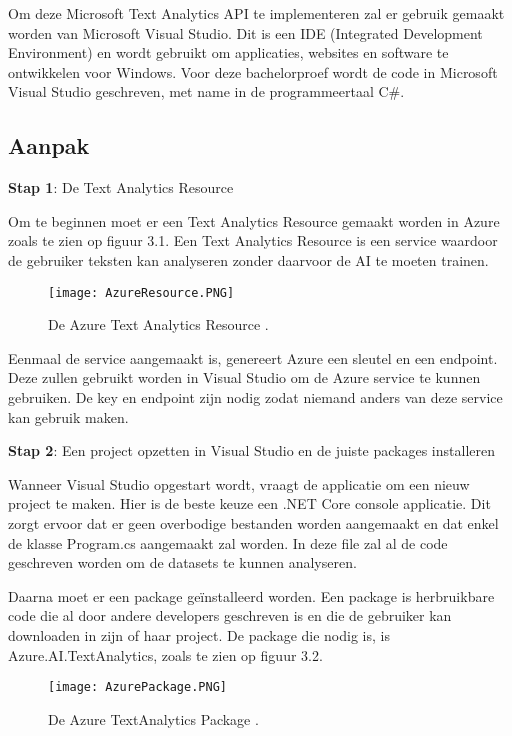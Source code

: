 Om deze Microsoft Text Analytics API te implementeren zal er gebruik gemaakt worden van Microsoft Visual Studio. Dit is een IDE (Integrated Development Environment) en wordt gebruikt om applicaties, websites en software te ontwikkelen voor Windows. Voor deze bachelorproef wordt de code in Microsoft Visual Studio geschreven, met name in de programmeertaal C\#. 

\subsection{Aanpak}
\label{aanpakazure}
\textbf{Stap 1}: De Text Analytics Resource

Om te beginnen moet er een Text Analytics Resource gemaakt worden in Azure zoals te zien op figuur 3.1. Een Text Analytics Resource is een service waardoor de gebruiker teksten kan analyseren zonder daarvoor de AI te moeten trainen. \autocite{Microsoft2020}

\begin{figure}[!htbp]
    \texttt{[image: AzureResource.PNG]}
    \caption{\label{azureresource}De Azure Text Analytics Resource \autocite{Microsoft2021}.}
\end{figure}
\FloatBarrier

Eenmaal de service aangemaakt is, genereert Azure een sleutel en een endpoint. Deze zullen gebruikt worden in Visual Studio om de Azure service te kunnen gebruiken. De key en endpoint zijn nodig zodat niemand anders van deze service kan gebruik maken. 

\textbf{Stap 2}: Een project opzetten in Visual Studio en de juiste packages installeren

Wanneer Visual Studio opgestart wordt, vraagt de applicatie om een nieuw project te maken. Hier is de beste keuze een .NET Core console applicatie. Dit zorgt ervoor dat er geen overbodige bestanden worden aangemaakt en dat enkel de klasse Program.cs aangemaakt zal worden. In deze file zal al de code geschreven worden om de datasets te kunnen analyseren. \autocite{Microsoft2020}

Daarna moet er een package geïnstalleerd worden. Een package is herbruikbare code die al door andere developers geschreven is en die de gebruiker kan downloaden in zijn of haar project. \autocite{Microsoft2018} De package die nodig is, is Azure.AI.TextAnalytics, zoals te zien op figuur 3.2.

\begin{figure}[!htbp]
    \texttt{[image: AzurePackage.PNG]}
    \caption{\label{azurepackage}De Azure TextAnalytics Package \autocite{Microsoft2020}.}
\end{figure}
\FloatBarrier


